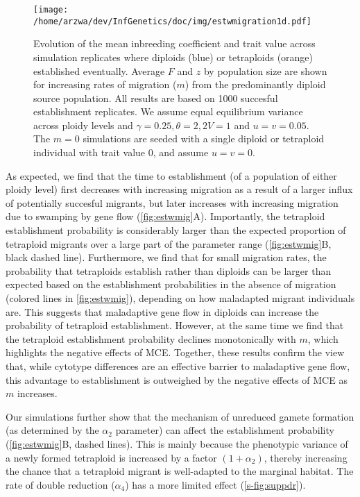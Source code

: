 \documentclass[12pt,a4paper]{article}
\begin{document}
\begin{figure}[t]
\centering
\texttt{[image: /home/arzwa/dev/InfGenetics/doc/img/estwmigration1d.pdf]}
\caption{
    Evolution of the mean inbreeding coefficient and trait value across
    simulation replicates where diploids (blue) or tetraploids (orange)
    established eventually.
    Average $F$ and $z$ by population size are shown for increasing rates
    of migration ($m$) from the predominantly diploid source population. 
    All results are based on 1000 succesful establishment replicates.
    We assume equal equilibrium variance across ploidy levels and $\gamma=0.25,
    \theta=2, 2V=1$ and $u=v=0.05$.
    The $m=0$ simulations are seeded with a single diploid or tetraploid
    individual with trait value 0, and assume $u=v=0$.
\label{fig:estwmig2}}
\end{figure}

As expected, we find that the time to establishment (of a population of either
ploidy level) first decreases with increasing migration as a result of a larger
influx of potentially succesful migrants, but later increases with increasing
migration due to swamping by gene flow (\cref{fig:estwmig}A).
Importantly, the tetraploid establishment probability is considerably larger
than the expected proportion of tetraploid migrants over a large part of the
parameter range (\cref{fig:estwmig}B, black dashed line).
Furthermore, we find that for small migration rates, the probability that
tetraploids establish rather than diploids can be larger than expected based on
the establishment probabilities in the absence of migration (colored lines in
\cref{fig:estwmig}), depending on how maladapted migrant individuals are.
This suggests that maladaptive gene flow in diploids can increase the
probability of tetraploid establishment.
However, at the same time we find that the tetraploid establishment probability
declines monotonically with $m$, which highlights the negative effects of MCE.
Together, these results confirm the view that, while cytotype differences are an
effective barrier to maladaptive gene flow, this advantage to establishment is
outweighed by the negative effects of MCE as $m$ increases.

Our simulations further show that the mechanism of unreduced gamete formation
(as determined by the $\alpha_2$ parameter) can affect the establishment
probability (\cref{fig:estwmig}B, dashed lines).
This is mainly because the phenotypic variance of a newly formed tetraploid is
increased by a factor $(1+\alpha_2)$, thereby increasing the chance that a
tetraploid migrant is well-adapted to the marginal habitat.
The rate of double reduction ($\alpha_4$) has a more limited effect
(\cref{s-fig:suppdr}).
\end{document}
